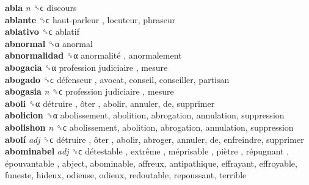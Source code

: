 \textbf{abla} \emph{n}  ␝ϲ  discours  \\
\textbf{ablante} ␝ϲ   haut-parleur , locuteur, phraseur  \\
\textbf{ablativo} ␝ϲ  ablatif  \\
\textbf{abnormal} ␝α  anormal  \\
\textbf{abnormalidad} ␝α   anormalité , anormalement  \\
\textbf{abogacia} ␝α   profession judiciaire , mesure  \\
\textbf{abogado} ␝ϲ   défenseur , avocat, conseil, conseiller, partisan  \\
\textbf{abogasia} \emph{n}  ␝ϲ   profession judiciaire , mesure  \\
\textbf{aboli} ␝α   détruire ,  ôter , abolir, annuler, de, supprimer  \\
\textbf{abolicion} ␝α  abolissement, abolition, abrogation, annulation, suppression  \\
\textbf{abolishon} \emph{n}  ␝ϲ  abolissement, abolition, abrogation, annulation, suppression  \\
\textbf{abolí} \emph{adj}  ␝ϲ   détruire ,  ôter , abolir, abroger, annuler, de, enfreindre, supprimer  \\
\textbf{abominabel} \emph{adj}  ␝ϲ   détestable ,  extrême ,  méprisable ,  piètre ,  répugnant ,  épouvantable , abject, abominable, affreux, antipathique, effrayant, effroyable, funeste, hideux, odieuse, odieux, redoutable, repoussant, terrible  \\
